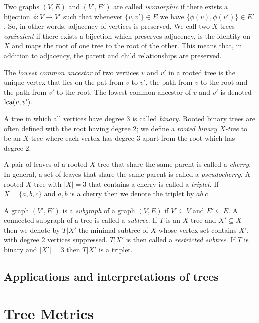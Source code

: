 Two graphs $(V,E)$ and $(V',E')$ are called \textit{isomorphic} if there
exists a bijection $\phi \colon V \to V'$ such that whenever $\{v,v'\} \in E$
we have $\{\phi(v),\phi(v')\} \in E'$.  So, in other words, adjacency of
vertices is preserved.  We call two $X$-trees \textit{equivalent} if there
exists a bijection which preserves adjacency, is the identity on $X$ and maps
the root of one tree to the root of the other.  This means that, in addition
to adjacency, the parent and child relationships are preserved.

The \textit{lowest common ancestor} of two vertices $v$ and $v'$ in a rooted
tree is the unique vertex that lies on the pat from $v$ to $v'$, the path from
$v$ to the root and the path from $v'$ to the root.  The lowest common
ancestor of $v$ and $v'$ is denoted $\operatorname{lca}(v,v')$.

A tree in which all vertices have degree 3 is called \textit{binary}.  Rooted
binary trees are often defined with the root having degree 2; we define a
\textit{rooted binary $X$-tree} to be an $X$-tree where each vertex has degree
3 apart from the root which has degree 2.

A pair of leaves of a rooted $X$-tree that share the same parent is called a
\textit{cherry}.  In general, a set of leaves that share the same parent is
called a \textit{pseudocherry}.  A rooted $X$-tree with $|X| = 3$ that
contains a cherry is called a \textit{triplet}.  If $X = \{a,b,c\}$ and $a,b$
is a cherry then we denote the triplet by $ab|c$.

A graph $(V',E')$ is a \textit{subgraph} of a graph $(V,E)$ if $V' \subseteq
V$ and $E' \subseteq E$.  A connected subgraph of a tree is called a
\textit{subtree}.  If $T$ is an $X$-tree and $X' \subseteq X$ then we denote
by $T|X'$ the minimal subtree of $X$ whose vertex set contains $X'$, with
degree 2 vertices suppressed.  $T|X'$ is then called a \textit{restricted
  subtree}.  If $T$ is binary and $|X'| = 3$ then $T|X'$ is a triplet.

\subsection{Applications and interpretations of trees}
\label{sec:appl-interpr-trees}


\section{Tree Metrics}
\label{sec:tree-metrics}

